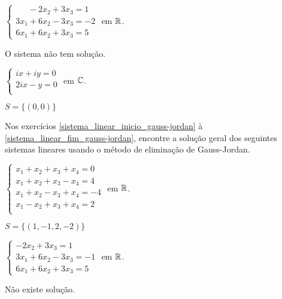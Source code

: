 \documentclass[12pt]{exam}
\begin{document}
\begin{exercicio}
  $
    \begin{cases}
      \phantom{2x_1} - 2x_2 + 3x_3 = 1\\
      3x_1 + 6x_2 - 3x_3 = -2\\
      6x_1 + 6x_2 + 3x_3 = 5
    \end{cases}
  $
  em $\mathbb{R}$.
  \begin{solucao}
    O sistema não tem solução.
  \end{solucao}
\end{exercicio}

\begin{exercicio}\label{sistema_linear_eliminacao}
  $
    \begin{cases}
      ix + iy = 0\\
      2ix - y = 0\\
    \end{cases}
  $
  em $\mathbb{C}$.
  \begin{solucao}
    $S = \{(0, 0)\}$
  \end{solucao}
\end{exercicio}

Nos exercícios \ref{sistema_linear_inicio_gauss-jordan} à \ref{sistema_linear_fim_gauss-jordan}, encontre a solução geral dos seguintes sistemas lineares usando o método de eliminação de Gauss-Jordan.

\begin{exercicio}\label{sistema_linear_inicio_gauss-jordan}
  $
    \begin{cases}
      x_1 + x_2 + x_3 + x_4 = 0\\
      x_1 + x_2 + x_3 - x_4 = 4\\
      x_1 + x_2 - x_3 + x_4 = -4\\
      x_1 - x_2 + x_3 + x_4 = 2\\
    \end{cases}
  $
  em $\mathbb{R}$.
  \begin{solucao}
    $S = \{(1, -1, 2, -2)\}$
  \end{solucao}
\end{exercicio}

\begin{exercicio}
  $
    \begin{cases}
      -2x_2 + 3x_3 = 1\\
      3x_1 + 6x_2 - 3x_3 = -1\\
      6x_1 + 6x_2 + 3x_3 = 5
    \end{cases}
  $
  em $\mathbb{R}$.
  \begin{solucao}
    Não existe solução.
  \end{solucao}
\end{exercicio}
\end{document}

